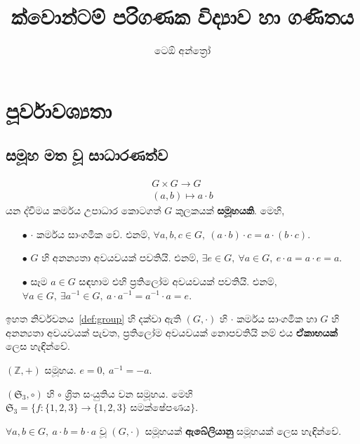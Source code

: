 \documentclass[10pt]{book}
\title{\bf ක්වො​​න්ට​​ම් ප​​රිග​ණක විද්‍යාව හා ග​​ණිත​ය}
\author{​ටෙ​ඕ අ​​න්​ත්‍රෝ}
\begin{document}
                        
\frontmatter                            
\maketitle                              
\tableofcontents                        
\listoffigures
\listoftables
\mainmatter  
\chapter{පූර්වාවශ්‍යතා}
\section{සමූහ මත වූ සාධාරණත්​ව}
\begin{definition}\label{def:group}
\begin{align*}
G \times G \to G\\
(a, b) \mapsto a\cdot b 
\end{align*}
යන ද්විමය කර්මය උපාධාර කොටගත් $G$ කුලකයක් \textbf{සමූහයකි}. මෙහි,
\begin{itemize}
\item[$\bullet$] $\cdot$ කර්ම​ය සාංගමික වේ. එනම්, $\forall a, b, c \in G,\ (a \cdot b)\cdot c = a\cdot (b \cdot c)$.
\item[$\bullet$] $G$ හි අනන්‍යතා අවයවයක් පවතියි. එනම්, $\exists e \in G,\ \forall a \in G,\ e \cdot a = a \cdot e = a$.
\item[$\bullet$] සෑම $a \in G$ සඳහාම එහි ප්‍රතිලෝ​ම අවයවයක් පවතියි. එනම්, $\forall a\in G,\ \exists a^{-1} \in G,\ a \cdot a^{-1} = a^{-1} \cdot a = e$.
\end{itemize}
\end{definition}
ඉහත නිර්වචනය~\ref{def:group} හි දක්වා ඇති $(G, \cdot)$ හි $\cdot$ කර්මය සාංගමික හා $G$ හි අනන්‍යතා අවයවයක් පැවත, ප්‍රතිලෝ​ම අවයවයක් නොපවතියි නම් එය \textbf{ඒකාභයක්} ලෙස හැඳින්වේ.
\begin{example}
$(\mathbb{Z}, +)$ සමූහය. $e = 0,\ a^{-1} = -a$.
\end{example}
\begin{example}\label{ex:group-non-abelian}
$(\mathfrak{S}_3, \circ)$ හි $\circ$ ශ්‍රිත සංයුතිය වන සමූහය. මෙහි $\mathfrak{S}_3 = \{f:\{1, 2, 3\} \to \{1, 2, 3\} \text{ සමක්ෂේප​ණය}\}$.
\end{example}

\begin{definition}
$\forall a, b \in G,\ a \cdot b = b \cdot a$ වූ $(G, \cdot)$ සමූහයක් \textbf{ඇබේලියානු} සමූහයක් ලෙස හැඳින්වේ.
\end{definition}
\end{document}
